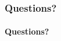 \documentclass[
    beamer                                       %
 , xelatex                                      %
]{common/mytemplate}
\begin{document}
% 
% 
% 
% 
% 
\begin{frame}
\frametitle{Questions?}
\framesubtitle{}

\begin{figure}[H]%
\end{figure}
\vspace{-10pt}
\centering\LARGE\textbf{Questions?}

\end{frame}
\end{document}
